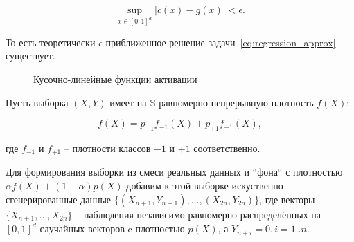 \[
    \sup \limits_{x \in [0,1]^d} |c(x) - g(x)| < \epsilon.
\]

То есть теоретически \(\epsilon\)-приближенное решение задачи~\cref{eq:regression_approx} существует.

\begin{figure}[ht]
    \caption{Кусочно-линейные функции активации}
    \label{fig:activations}
\end{figure}

Пусть выборка \((X, Y)\) имеет на \(\mathbb{S}\) равномерно непрерывную плотность \(f(X)\):

\[
    f(X) = p_{-1} f_{-1}(X) + p_{+1} f_{+1}(X),
\]

\noindent где \(f_{-1}\) и \(f_{+1}\) -- плотности классов \(-1\) и \(+1\) соответственно.

Для формирования выборки из смеси реальных данных и ``фона`` с плотностью \(\alpha f(X) + (1 - \alpha) p(X)\) добавим к этой выборке искуственно сгенерированные данные \(\{(X_{n+1}, Y_{n+1}), \dots, (X_{2n}, Y_{2n})\}\), где векторы \(\{X_{n+1}, \dots, X_{2n}\}\) -- наблюдения независимо равномерно распределённых на \([0, 1]^d\) случайных векторов c плотностью \(p(X)\), а \(Y_{n+i} = 0, i=1..n\).

